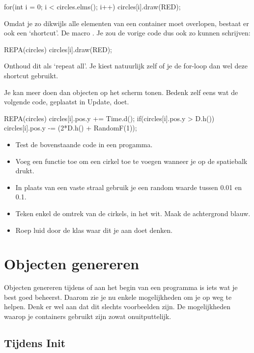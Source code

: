 \begin{code}
for(int i = 0; i < circles.elms(); i++)
{
  circles[i].draw(RED);
}
\end{code}

Omdat je zo dikwijls alle elementen van een container moet overlopen, bestaat er ook een `shortcut'. De macro . Je zou de vorige code dus ook zo kunnen schrijven:

\begin{code}
REPA(circles)
{
  circles[i].draw(RED);
}
\end{code}

Onthoud dit als `repeat all'. Je kiest natuurlijk zelf of je de for-loop dan wel deze shortcut gebruikt.

Je kan meer doen dan objecten op het scherm tonen. Bedenk zelf eens wat de volgende code, geplaatst in Update, doet.

\begin{code}
REPA(circles)
{
	circles[i].pos.y += Time.d();
	if(circles[i].pos.y > D.h()) {
	  circles[i].pos.y -= (2*D.h() + RandomF(1));
	}
}
\end{code}

\begin{exercise}
\begin{itemize}
\item Test de bovenstaande code in een progamma.
\item Voeg een functie toe om een cirkel toe te voegen wanneer je op de spatiebalk drukt.
\item In plaats van een vaste straal gebruik je een random waarde tussen 0.01 en 0.1.
\item Teken enkel de omtrek van de cirkels, in het wit. Maak de achtergrond blauw.
\item Roep luid door de klas waar dit je aan doet denken.
\end{itemize}
\end{exercise}

\section{Objecten genereren}
Objecten genereren tijdens of aan het begin van een programma is iets wat je best goed beheerst. Daarom zie je nu enkele mogelijkheden om je op weg te helpen. Denk er wel aan dat dit slechts voorbeelden zijn. De mogelijkheden waarop je containers gebruikt zijn zowat onuitputtelijk.

\subsection{Tijdens Init}

